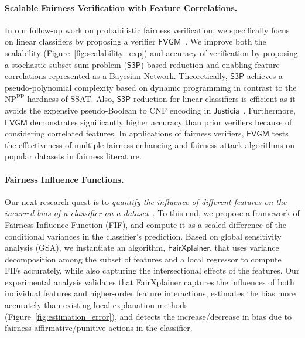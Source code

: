 \documentclass{article}
\begin{document}
	\paragraph{Scalable Fairness Verification with Feature Correlations.} In our follow-up work on probabilistic fairness verification, we specifically focus on linear classifiers by proposing a verifier $ \mathsf{FVGM} $~\cite{ghosh2022algorithmic}. We improve both the scalability (Figure~\ref{fig:scalability_exp}) and accuracy of verification by proposing a stochastic subset-sum problem ($ \mathsf{S3P} $) based reduction and enabling feature correlations represented as a Bayesian Network. Theoretically, $ \mathsf{S3P} $ achieves a pseudo-polynomial complexity based on dynamic programming in contrast to the $ \mathrm{NP}^{\mathrm{PP}} $ hardness of SSAT. Also, $ \mathsf{S3P} $ reduction for linear classifiers is efficient as it avoids the expensive pseudo-Boolean to CNF encoding in $ \mathsf{Justicia} $~\cite{ghosh2021justicia}. Furthermore, $ \mathsf{FVGM} $ demonstrates significantly higher accuracy than prior verifiers because of considering correlated features. In applications of fairness verifiers, $ \mathsf{FVGM} $ tests the effectiveness of multiple fairness enhancing and fairness attack algorithms on popular datasets in fairness literature.
	
	
	\paragraph{Fairness Influence Functions.} Our next research quest is to \emph{quantify the influence of different features on the incurred bias of a classifier on a dataset}~\cite{ghosh2022how}. To this end, we propose a framework of Fairness Influence Function (FIF), and compute it as a scaled difference of the conditional variances in the classifier’s prediction. Based on global sensitivity analysis (GSA), we instantiate an algorithm, $ \mathsf{FairXplainer} $, that uses variance decomposition among the subset of features and a local regressor to compute FIFs accurately, while also capturing the intersectional effects of the features. Our experimental analysis validates that FairXplainer captures the influences of both individual features and higher-order feature interactions, estimates the bias more accurately than existing local explanation methods (Figure~\ref{fig:estimation_error}), and detects the increase/decrease in bias due to fairness affirmative/punitive actions in the classifier.
	
\end{document}

